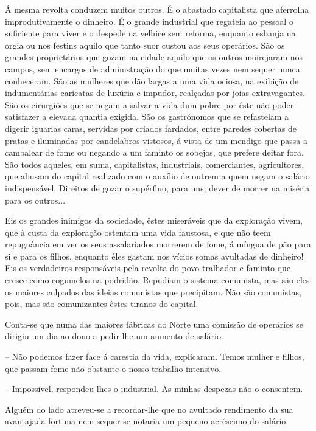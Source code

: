 \documentclass[9pt]{article}
\begin{document}
Á mesma revolta conduzem muitos outros. É o abastado capitalista que
aferro\-lha improdutivamente o dinheiro. É o gran\-de industrial que regateia
ao pessoal o suficiente para viver e o despede na ve\-lhice sem reforma, enquanto esbanja na orgia ou nos festins
aquilo que tanto suor custou aos seus operários. São os gran\-des proprietários que gozam na cidade aquilo que os outros moirejaram nos campos, sem encargos de administra\-ção do que muitas vezes nem sequer nunca conheceram. São
as mu\-lheres que dão largas a uma vida ociosa, na exibi\-ção de indumentárias
caricatas de luxúria e impudor, realçadas por joias extravagantes. São os
cirurgiões que se negam a salvar a vida dum pobre por êste não poder satisfazer a elevada quantia exigida. São os gastrónomos que se refastelam a
digerir iguarias caras, servidas por criados fardados, entre paredes cobertas
de pratas e iluminadas por candelabros vistosos, á vista de um mendigo que
passa a cambalear de fome ou negando a um faminto os sobejos, que prefere
deitar fora. São todos aqueles, em suma, capitalistas, industriais, comerciantes, agricultores,
que abusam do capital realizado com o auxílio de outrem a quem negam o salário indispensável. Direitos de gozar o supérfluo, para uns; dever de morrer na miséria para os outros...

Eis os gran\-des inimigos da sociedade, êstes miseráveis que da explora\-ção vivem, que à custa da explora\-ção ostentam uma vida faustosa, e que não
teem repugnância em ver os seus assalariados morrerem de fome, á míngua de
pão para si e para os fi\-lhos, enquanto êles gastam nos vícios somas avultadas de dinheiro! Eis os verdadeiros responsáveis pela revolta do povo tra\-lhador e faminto que cresce como cogumelos na podridão.
Repudiam o sistema comunista, mas são eles os maiores culpados das ideias comunistas que precipitam. Não são comunistas, pois, mas são
comunizantes êstes tiranos do capital.

Conta-se que numa das maiores fá\-bri\-cas do Norte uma comissão de operários se dirigiu um dia ao dono a pedir-lhe um aumento de salário.

-- Não podemos fazer face á carestia da vida, explicaram. Temos mu\-lher
e fi\-lhos, que passam fome não obstante o nosso traba\-lho intensivo.

-- Impossível, respondeu-\-lhes o industrial. As minhas despezas não o
consentem.

Alguém do lado atreveu-se a recordar-\-lhe que no avultado rendimento
da sua avantajada fortuna nem sequer se notaria um pequeno acréscimo do
salário.
\end{document}
